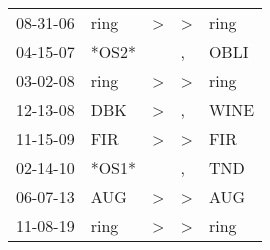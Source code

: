 \begin{supertabular}{lllll}
 08-31-06 &   ring &     \textgreater &  \textgreater &   ring \\
 04-15-07 &  *OS2* &                  &             , &   OBLI \\
 03-02-08 &   ring &     \textgreater &  \textgreater &   ring \\
 12-13-08 &    DBK &     \textgreater &             , &   WINE \\
 11-15-09 &    FIR &     \textgreater &  \textgreater &    FIR \\
 02-14-10 &  *OS1* &                  &             , &    TND \\
 06-07-13 &    AUG &     \textgreater &  \textgreater &    AUG \\
 11-08-19 &   ring &     \textgreater &  \textgreater &   ring \\
\end{supertabular}
